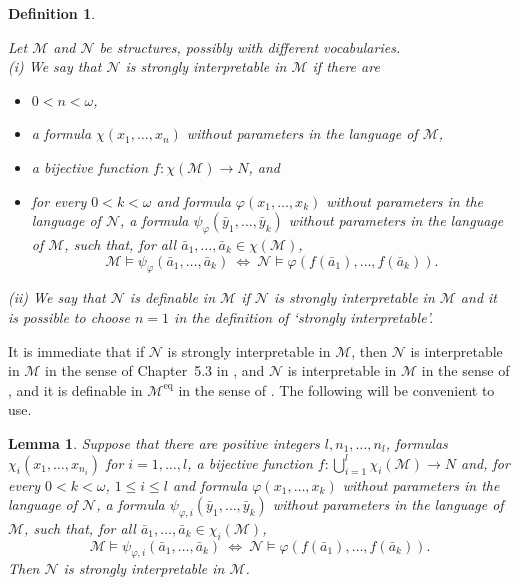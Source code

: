 \documentclass[11pt, twoside]{amsart}
\newtheorem{lem}[theor]{Lemma}
\newtheorem{defin}[theor]{Definition}
\numberwithin{equation}{section}
\newcommand{\meq}{^{\mathrm{eq}}}
\newcommand{\mcM}{\mathcal{M}}
\newcommand{\mcN}{\mathcal{N}}
\begin{document}
\begin{defin}\label{definition of strong interpretability}{\rm
Let $\mcM$ and $\mcN$ be structures, possibly with different vocabularies.\\
(i) We say that $\mcN$ is {\em strongly interpretable in $\mcM$} if there are
\begin{itemize}
\item $0 < n < \omega$, 
\item a formula $\chi(x_1, \ldots, x_n)$ without parameters in the language of $\mcM$,
\item a bijective function $f : \chi(\mcM) \to N$, and
\item for every $0 < k < \omega$ and formula $\varphi(x_1, \ldots, x_k)$ without parameters in the language of $\mcN$,
a formula $\psi_\varphi(\bar{y}_1, \ldots, \bar{y}_k)$ without parameters in the language of $\mcM$,
such that, for all $\bar{a}_1, \ldots, \bar{a}_k \in \chi(\mcM)$, 
\[ \mcM \models \psi_\varphi(\bar{a}_1, \ldots, \bar{a}_k) \ \Longleftrightarrow \ \mcN \models \varphi(f(\bar{a}_1), \ldots, f(\bar{a}_k)).\]
\end{itemize}
(ii) We say that $\mcN$ is {\em definable in $\mcM$} if $\mcN$ is strongly interpretable in $\mcM$ and it is possible to
choose $n = 1$ in the definition of `strongly interpretable'.
}\end{defin}

\noindent
It is immediate that if $\mcN$ is strongly interpretable in $\mcM$, 
then $\mcN$ is interpretable in $\mcM$ in the sense of Chapter~5.3 in \cite{Hod}, and $\mcN$ is interpretable in $\mcM$ 
in the sense of \cite{Mac91}, and it is definable in $\mcM\meq$ in the sense of \cite{PK}.
The following will be convenient to use.

\begin{lem}\label{equivalent condition of being strongly interpretable}
Suppose that there are positive integers $l, n_1, \ldots, n_l$, formulas $\chi_i(x_1, \ldots, x_{n_i})$ for $i = 1, \ldots, l$,
a bijective function $f : \bigcup_{i=1}^l \chi_i(\mcM) \to N$ and, for every
$0 < k < \omega$, $1 \leq i \leq l$ and formula $\varphi(x_1, \ldots, x_k)$ without parameters in the language of $\mcN$,
a formula $\psi_{\varphi,i}(\bar{y}_1, \ldots, \bar{y}_k)$ without parameters in the language of $\mcM$,
such that, for all $\bar{a}_1, \ldots, \bar{a}_k \in \chi_i(\mcM)$, 
\[ \mcM \models \psi_{\varphi,i}(\bar{a}_1, \ldots, \bar{a}_k) \ \Longleftrightarrow \ \mcN \models \varphi(f(\bar{a}_1), \ldots, f(\bar{a}_k)).\]
Then $\mcN$ is strongly interpretable in $\mcM$.
\end{lem}
\end{document}
